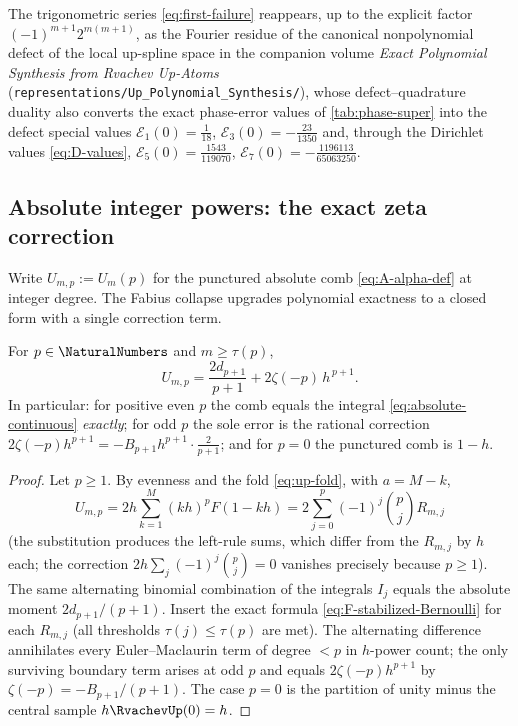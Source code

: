 \begin{remark}
The trigonometric series \eqref{eq:first-failure} reappears, up to
the explicit factor $(-1)^{m+1}2^{m(m+1)}$, as the Fourier residue of
the canonical nonpolynomial defect of the local up-spline space in
the companion volume \emph{Exact Polynomial Synthesis from Rvachev
Up-Atoms} (\nolinkurl{representations/Up_Polynomial_Synthesis/}),
whose defect--quadrature duality also converts the exact phase-error
values of \cref{tab:phase-super} into the defect special values
$\mathcal E_1(0)=\tfrac1{18}$,
$\mathcal E_3(0)=-\tfrac{23}{1350}$ and, through the Dirichlet
values \eqref{eq:D-values},
$\mathcal E_5(0)=\tfrac{1543}{119070}$,
$\mathcal E_7(0)=-\tfrac{1196113}{65063250}$.
\end{remark}

\subsection{Absolute integer powers: the exact zeta correction}

Write $U_{m,p}:=U_m(p)$ for the punctured absolute comb
\eqref{eq:A-alpha-def} at integer degree.  The Fabius collapse
upgrades polynomial exactness to a closed form with a single
correction term.

\begin{theorem}
\label{thm:absolute-integer}
For $p\in\NaturalNumbers$ and $m\ge\tau(p)$,
\begin{equation}
 \boxed{\;
 U_{m,p}
 =\frac{2d_{p+1}}{p+1}
 +2\zeta(-p)\,h^{\,p+1}.
 \;}
 \label{eq:absolute-integer-closed}
\end{equation}
In particular: for positive even $p$ the comb equals the integral
\eqref{eq:absolute-continuous} \emph{exactly}; for odd $p$ the sole
error is the rational correction $2\zeta(-p)h^{p+1}
=-B_{p+1}h^{p+1}\cdot\frac{2}{p+1}$; and for $p=0$ the punctured comb
is $1-h$.
\end{theorem}

\begin{proof}
Let $p\ge1$.  By evenness and the fold \eqref{eq:up-fold}, with
$a=M-k$,
\[
 U_{m,p}
 =2h\sum_{k=1}^{M}(kh)^{p}F(1-kh)
 =2\sum_{j=0}^{p}(-1)^{j}\binom pj R_{m,j}
\]
(the substitution produces the left-rule sums, which differ from the
$R_{m,j}$ by $h$ each; the correction
$2h\sum_j(-1)^{j}\binom pj=0$ vanishes precisely because $p\ge1$).
The same alternating binomial combination of the integrals $I_j$
equals the absolute moment $2d_{p+1}/(p+1)$.  Insert the exact
formula \eqref{eq:F-stabilized-Bernoulli} for each $R_{m,j}$ (all
thresholds $\tau(j)\le\tau(p)$ are met).  The alternating difference
annihilates every Euler--Maclaurin term of degree $<p$ in $h$-power
count; the only surviving boundary term arises at odd $p$ and equals
$2\zeta(-p)h^{p+1}$ by $\zeta(-p)=-B_{p+1}/(p+1)$.  The case $p=0$ is
the partition of unity minus the central sample $h\RvachevUp(0)=h$.
\end{proof}

